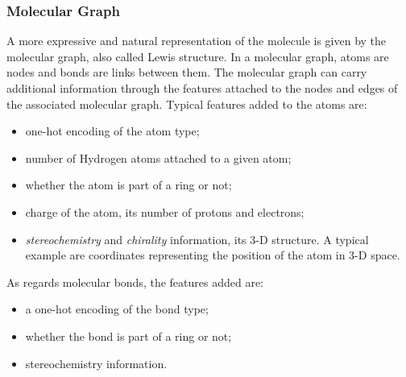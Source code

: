 \subsubsection*{Molecular Graph}
A more expressive and natural representation of the molecule is given by the molecular graph, also called Lewis structure. In a molecular graph, atoms are nodes and bonds are links between them. The molecular graph can carry additional information through the features attached to the nodes and edges of the associated molecular graph. Typical features added to the atoms are:
\begin{itemize}
    \item one-hot encoding of the atom type;
    \item number of Hydrogen atoms attached to a given atom;
    \item whether the atom is part of a ring or not;
    \item charge of the atom, \ie its number of protons and electrons;
    \item \emph{stereochemistry} and \emph{chirality} information, \ie its 3-D structure. A typical example are coordinates representing the position of the atom in 3-D space.
\end{itemize}
As regards molecular bonds, the features added are:
\begin{itemize}
    \item a one-hot encoding of the bond type;
    \item whether the bond is part of a ring or not;
    \item stereochemistry information.
\end{itemize}

